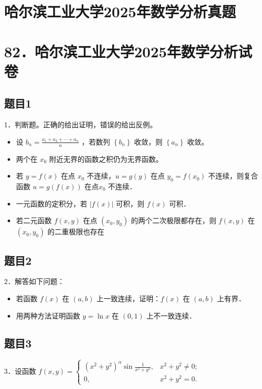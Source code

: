 \documentclass{article}
\begin{document}
\section*{哈尔滨工业大学2025年数学分析真题}
\section*{82．哈尔滨工业大学2025年数学分析试卷}

\subsection{题目1}
1．判断题。正确的给出证明，错误的给出反例。

\begin{itemize}
  \item[（1）] 设 \(b_{n}=\frac{a_{1}+a_{2}+\cdots+a_{n}}{n}\) ，若数列 \(\left\{b_{n}\right\}\) 收敛，则 \(\left\{a_{n}\right\}\) 收敛。
  \item[（2）] 两个在 \(x_{0}\) 附近无界的函数之积仍为无界函数。
  \item[（3）] 若 \(y=f(x)\) 在点 \(x_{0}\) 不连续，\(u=g(y)\) 在点 \(y_{0}=f\left(x_{0}\right)\) 不连续，则复合函数 \(u=g(f(x))\) 在点\(x_{0}\) 不连续．
  \item[（4）] 一元函数的定积分，若 \(|f(x)|\) 可积，则 \(f(x)\) 可积．
  \item[（5）] 若二元函数 \(f(x, y)\) 在点 \(\left(x_{0}, y_{0}\right)\) 的两个二次极限都存在，则 \(f(x, y)\) 在 \(\left(x_{0}, y_{0}\right)\) 的二重极限也存在
\end{itemize}

\subsection{题目2}
2．解答如下问题：

\begin{itemize}
  \item[（1）] 若函数 \(f(x)\) 在 \((a, b)\) 上一致连续，证明：\(f(x)\) 在 \((a, b)\) 上有界．
  \item[（2）] 用两种方法证明函数 \(y=\ln x\) 在 \((0,1)\) 上不一致连续．
\end{itemize}

\subsection{题目3}
3．设函数 \(f(x, y)= \begin{cases}\left(x^{2}+y^{2}\right)^{\alpha} \sin \frac{1}{x^{2}+y^{2}}, & x^{2}+y^{2} \neq 0 ; \\ 0, & x^{2}+y^{2}=0 .\end{cases}\)
\end{document}
